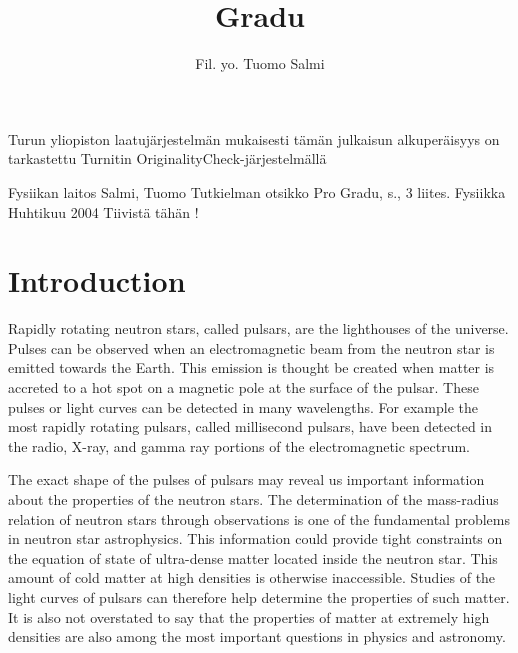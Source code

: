 \documentclass{wihuri}
\begin{document}
\title{Gradu}
\author{Fil. yo. Tuomo Salmi}
\maketitle
\newpage
\thispagestyle{empty}
\vspace*{10cm}

\vfill

\hspace*{-2cm}\parbox{\textwidth}{Turun yliopiston laatujärjestelmän mukaisesti
  tämän julkaisun alkuperäisyys on tarkastettu Turnitin
  OriginalityCheck-järjestelmällä} 


\newpage
\begin{tiivistelma}%
        {Fysiikan laitos}%
        {Salmi, Tuomo}%
        {Tutkielman otsikko}
        {Pro Gradu, \pageref{LastPage} s., 3 liites.}%
        {Fysiikka}%
        {Huhtikuu 2004}%
	Tiivistä tähän !
\end{tiivistelma}
\tableofcontents %
\newpage
\section*{Introduction}

Rapidly rotating neutron stars, called pulsars, are the lighthouses of the universe. Pulses can be observed when an electromagnetic beam from the neutron star is emitted towards the Earth.  This emission is thought be created when matter is accreted to a hot spot on a magnetic pole at the surface of the pulsar. These pulses or light curves can be detected in many wavelengths. For example the most rapidly rotating pulsars, called millisecond pulsars, have been detected in the radio, X-ray, and gamma ray portions of the electromagnetic spectrum.

The exact shape of the pulses of pulsars may reveal us important information about the properties of the neutron stars. The determination of the mass-radius relation of neutron stars through observations is one of the fundamental problems in neutron star astrophysics. This information could provide tight constraints on the equation of state of ultra-dense matter located inside the neutron star. This amount of cold matter at high densities is otherwise inaccessible. Studies of the light curves of pulsars can therefore help determine the properties of such matter. It is also not overstated to say that the properties of matter at extremely high densities are also among the most important questions in physics and astronomy. 
\end{document}
